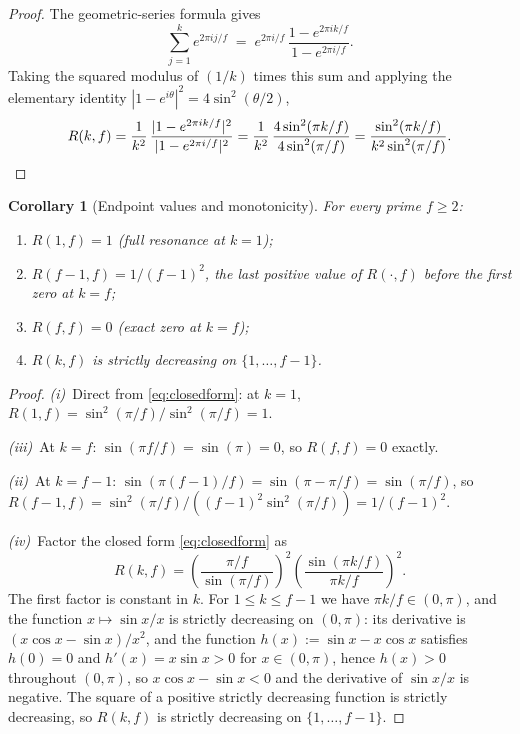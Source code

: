 \documentclass[11pt,reqno]{amsart}
\theoremstyle{plain}
\newtheorem{corollary}[theorem]{Corollary}
\theoremstyle{definition}
\theoremstyle{remark}
\begin{document}
\begin{proof}
The geometric-series formula gives
\[
  \sum_{j=1}^{k}e^{2\pi i j/f}
  \;=\; e^{2\pi i/f}\,\frac{1-e^{2\pi i k/f}}{1-e^{2\pi i/f}}.
\]
Taking the squared modulus of $(1/k)$ times this sum and applying
the elementary identity $|1-e^{i\theta}|^{2} = 4\sin^{2}(\theta/2)$,
\[
  R(k,f)
  = \frac{1}{k^{2}}\,
    \frac{|1-e^{2\pi i k/f}|^{2}}{|1-e^{2\pi i/f}|^{2}}
  = \frac{1}{k^{2}}\,
    \frac{4\sin^{2}(\pi k/f)}{4\sin^{2}(\pi/f)}
  = \frac{\sin^{2}(\pi k/f)}{k^{2}\sin^{2}(\pi/f)}.
\qedhere
\]
\end{proof}

\begin{corollary}[Endpoint values and monotonicity]\label{cor:endpoints}
For every prime $f \ge 2$:
\begin{enumerate}[label={\upshape(\roman*)}]
\item $R(1,f) = 1$ (full resonance at $k = 1$);
\item $R(f-1,f) = 1/(f-1)^{2}$, the last positive value of
      $R(\cdot,f)$ before the first zero at $k=f$;
\item $R(f,f) = 0$ (exact zero at $k=f$);
\item $R(k,f)$ is strictly decreasing on $\{1,\dots,f-1\}$.
\end{enumerate}
\end{corollary}

\begin{proof}
\textit{(i)}\ Direct from \eqref{eq:closedform}: at $k=1$,
$R(1,f) = \sin^{2}(\pi/f)/\sin^{2}(\pi/f) = 1$.

\textit{(iii)}\ At $k=f$: $\sin(\pi f/f) = \sin(\pi) = 0$, so
$R(f,f) = 0$ exactly.

\textit{(ii)}\ At $k=f-1$: $\sin(\pi(f-1)/f) = \sin(\pi - \pi/f)
= \sin(\pi/f)$, so $R(f-1,f) = \sin^{2}(\pi/f)/((f-1)^{2}
\sin^{2}(\pi/f)) = 1/(f-1)^{2}$.

\textit{(iv)}\ Factor the closed form \eqref{eq:closedform} as
\[
  R(k,f) = \left(\frac{\pi/f}{\sin(\pi/f)}\right)^{2}
           \left(\frac{\sin(\pi k/f)}{\pi k/f}\right)^{2}.
\]
The first factor is constant in $k$. For $1\le k\le f-1$ we have
$\pi k/f\in(0,\pi)$, and the function $x \mapsto \sin x/x$ is strictly
decreasing on $(0,\pi)$: its derivative is
$(x\cos x - \sin x)/x^{2}$, and the function
$h(x):= \sin x - x\cos x$ satisfies $h(0)=0$ and
$h'(x) = x\sin x > 0$ for $x\in(0,\pi)$, hence $h(x) > 0$ throughout
$(0,\pi)$, so $x\cos x - \sin x < 0$ and the derivative of
$\sin x/x$ is negative. The square of a positive
strictly decreasing function is strictly decreasing, so $R(k,f)$ is
strictly decreasing on $\{1,\dots,f-1\}$.
\end{proof}
\end{document}
